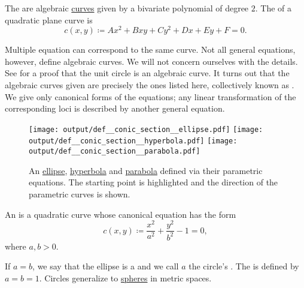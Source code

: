\begin{definition}\label{def:quadratic_plane_curve}
  The  are algebraic \hyperref[rem:geometric_shape/algebraic]{curves} given by a bivariate polynomial of degree \( 2 \). The  of a quadratic plane curve is
  \begin{equation}\label{def:quadratic_plane_curve/general_equation}
    c(x, y) \coloneqq A x^2 + B xy + C y^2 + Dx + Ey + F = 0.
  \end{equation}

  Multiple equation can correspond to the same curve. Not all general equations, however, define algebraic curves. We will not concern ourselves with the details. See  for a proof that the unit circle is an algebraic curve. It turns out that the algebraic curves given  are precisely the ones listed here, collectively known as . We give only canonical forms of the equations; any linear transformation of the corresponding loci is described by another general equation.

  \begin{figure}[!ht]
    \hfill
    \hfill
    \texttt{[image: output/def\_\_conic\_section\_\_ellipse.pdf]}
    \hfill
    \texttt{[image: output/def\_\_conic\_section\_\_hyperbola.pdf]}
    \hfill
    \texttt{[image: output/def\_\_conic\_section\_\_parabola.pdf]}
    \hfill
    \caption{An \hyperref[def:quadratic_plane_curve/ellipse]{ellipse}, \hyperref[def:quadratic_plane_curve/hyperbola]{hyperbola} and \hyperref[def:quadratic_plane_curve/parabola]{parabola} defined via their parametric equations. The starting point is highlighted and the direction of the parametric curves is shown.}\label{def:quadratic_plane_curve/figure}
  \end{figure}

  \begin{thmenum}
     An  is a quadratic curve whose canonical equation has the form
    \begin{equation}\label{def:quadratic_plane_curve/ellipse/canonical_equation}
      c(x, y) \coloneqq \frac {x^2} {a^2} + \frac {y^2} {b^2} - 1 = 0,
    \end{equation}
    where \( a, b > 0 \).

    If \( a = b \), we say that the ellipse is a  and we call \( a \) the circle's . The  is defined by \( a = b = 1 \). Circles generalize to \hyperref[def:metric_space/sphere]{spheres} in metric spaces.


\end{thmenum}
\end{definition}
